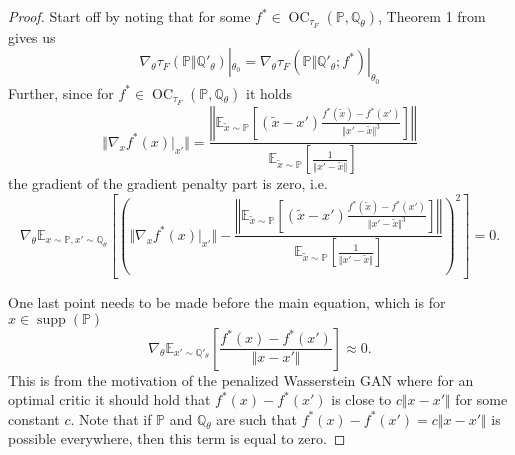 \documentclass{article}
\DeclareMathOperator{\supp}{supp}
\DeclareMathOperator{\oc}{OC}
\begin{document}
\begin{proof}
Start off by noting that for some $f^*\in\oc_{\tau_F}(\mathbb P,\mathbb Q_\theta)$, Theorem 1 from \cite{milgrom2002envelope} gives us
\[\nabla_\theta\tau_F(\mathbb P\Vert\mathbb Q'_\theta)|_{\theta_0}=\nabla_\theta\tau_F(\mathbb P\Vert\mathbb Q'_\theta;f^*)|_{\theta_0}\]
Further, since for $f^*\in\oc_{\tau_F}(\mathbb P,\mathbb Q_\theta)$ it holds
\[\Vert\nabla_x f^*(x)\big|_{x'}\Vert=
  \frac{\left\Vert\mathbb E_{\tilde x\sim\mathbb P}[(\tilde x- x')\frac{f^*(\tilde x)-f^*(x')}{\Vert x'-\tilde x\Vert^3}]\right\Vert}
 {\mathbb E_{\tilde x\sim\mathbb P}[\frac{1}{\Vert x'-\tilde x\Vert}]}\]
the gradient of the gradient penalty part is zero, i.e.
\[\nabla_\theta\mathbb E_{x\sim\mathbb P,x'\sim\mathbb Q_\theta}\left[\left(\Vert\nabla_x f^*(x)\big|_{x'}\Vert-
  \frac{\left\Vert\mathbb E_{\tilde x\sim\mathbb P}[(\tilde x- x')\frac{f^*(\tilde x)-f^*(x')}{\Vert x'-\tilde x\Vert^3}]\right\Vert}
 {\mathbb E_{\tilde x\sim\mathbb P}[\frac{1}{\Vert x'-\tilde x\Vert}]}
  \right)^2\right]=0.\]

One last point needs to be made before the main equation, which is for $x\in\supp(\mathbb P)$
\[\nabla_\theta\mathbb E_{x'\sim\mathbb Q'_\theta}\left[\frac{f^*(x)-f^*(x')}{\Vert x - x'\Vert}\right]\approx 0.\]
This is from the motivation of the penalized Wasserstein GAN where for an optimal critic it should hold that
$f^*(x)-f^*(x')$ is close to $c\Vert x - x'\Vert$ for some constant $c$. Note that if $\mathbb P$ and $\mathbb Q_\theta$
are such that $f^*(x)-f^*(x')=c\Vert x - x'\Vert$ is possible everywhere, then this term is equal to zero.


\end{proof}
\end{document}
